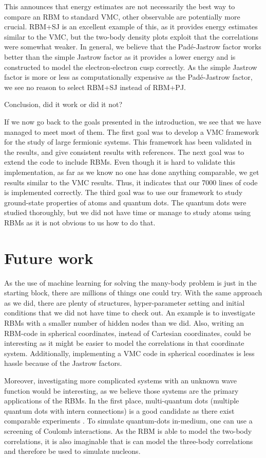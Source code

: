 This announces that energy estimates are not necessarily the best way to compare an RBM to standard VMC, other observable are potentially more crucial. RBM+SJ is an excellent example of this, as it provides energy estimates similar to the VMC, but the two-body density plots exploit that the correlations were somewhat weaker. In general, we believe that the Padé-Jastrow factor works better than the simple Jastrow factor as it provides a lower energy and is constructed to model the electron-electron cusp correctly. As the simple Jastrow factor is more or less as computationally expensive as the Padé-Jastrow factor, we see no reason to select RBM+SJ instead of RBM+PJ.

Conclusion, did it work or did it not?

If we now go back to the goals presented in the introduction, we see that we have managed to meet most of them. The first goal was to develop a VMC framework for the study of large fermionic systems. This framework has been validated in the results, and give consistent results with references. The next goal was to extend the code to include RBMs. Even though it is hard to validate this implementation, as far as we know no one has done anything comparable, we get results similar to the VMC results. Thus, it indicates that our 7000 lines of code is implemented correctly. The third goal was to use our framework to study ground-state properties of atoms and quantum dots. The quantum dots were studied thoroughly, but we did not have time or manage to study atoms using RBMs as it is not obvious to us how to do that. 

\section*{Future work}
As the use of machine learning for solving the many-body problem is just in the starting block, there are millions of things one could try. With the same approach as we did, there are plenty of structures, hyper-parameter setting and initial conditions that we did not have time to check out. An example is to investigate RBMs with a smaller number of hidden nodes than we did. Also, writing an RBM-code in spherical coordinates, instead of Cartesian coordinates, could be interesting as it might be easier to model the correlations in that coordinate system. Additionally, implementing a VMC code in spherical coordinates is less hassle because of the Jastrow factors. 

Moreover, investigating more complicated systems with an unknown wave function would be interesting, as we believe those systems are the primary applications of the RBMs. In the first place, multi-quantum dots (multiple quantum dots with intern connections) is a good candidate as there exist comparable experiments \cite{marzin_photoluminescence_1994,brunner_sharp-line_1994}. To simulate quantum-dots in-medium, one can use a screening of Coulomb interactions. As the RBM is able to model the two-body correlations, it is also imaginable that is can model the three-body correlations and therefore be used to simulate nucleons.

